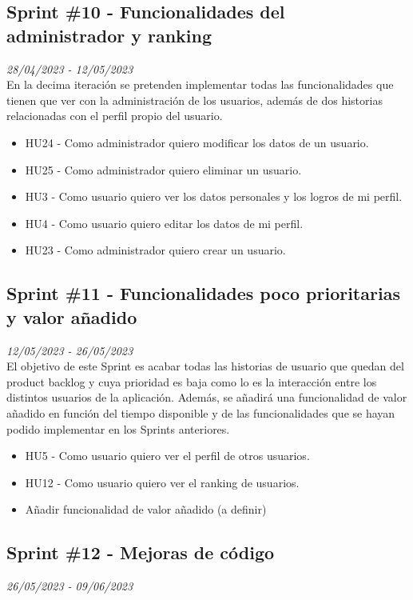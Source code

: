 \subsection{Sprint \#10 - Funcionalidades del administrador y ranking}
\textit{28/04/2023   -   12/05/2023}\\

En la decima iteración se pretenden implementar todas las funcionalidades que tienen que ver con la administración de los usuarios, además de
dos historias relacionadas con el perfil propio del usuario.
\begin{itemize}
    \item HU24 - Como administrador quiero modificar los datos de un usuario.
    \item HU25 - Como administrador quiero eliminar un usuario.
    \item HU3 - Como usuario quiero ver los datos personales y los logros de mi perfil.
    \item HU4 - Como usuario quiero editar los datos de mi perfil.
    \item HU23 - Como administrador quiero crear un usuario.

\end{itemize}

\subsection{Sprint \#11 - Funcionalidades poco prioritarias y valor añadido}
\textit{12/05/2023   -   26/05/2023}\\

El objetivo de este Sprint es acabar todas las historias de usuario que quedan del product backlog y cuya prioridad es baja como lo es la interacción entre los distintos usuarios de la aplicación. Además, se añadirá una funcionalidad de valor añadido
en función del tiempo disponible y de las funcionalidades que se hayan podido implementar en los Sprints anteriores.
\begin{itemize}
    \item HU5 - Como usuario quiero ver el perfil de otros usuarios.
    \item HU12 - Como usuario quiero ver el ranking de usuarios.
    \item Añadir funcionalidad de valor añadido (a definir)
\end{itemize}

\subsection{Sprint \#12 - Mejoras de código}
\textit{26/05/2023   -   09/06/2023}\\

